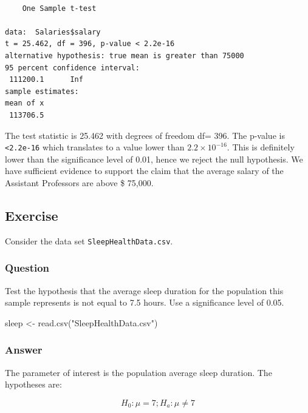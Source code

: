 \documentclass[
  letterpaper,
  DIV=11,
  numbers=noendperiod]{scrartcl}
\newenvironment{Shaded}{\begin{snugshade}}{\end{snugshade}}
\newcommand{\AttributeTok}[1]{\textcolor[rgb]{0.40,0.45,0.13}{#1}}
\newcommand{\DecValTok}[1]{\textcolor[rgb]{0.68,0.00,0.00}{#1}}
\newcommand{\FunctionTok}[1]{\textcolor[rgb]{0.28,0.35,0.67}{#1}}
\newcommand{\NormalTok}[1]{\textcolor[rgb]{0.00,0.23,0.31}{#1}}
\newcommand{\OtherTok}[1]{\textcolor[rgb]{0.00,0.23,0.31}{#1}}
\newcommand{\SpecialCharTok}[1]{\textcolor[rgb]{0.37,0.37,0.37}{#1}}
\newcommand{\StringTok}[1]{\textcolor[rgb]{0.13,0.47,0.30}{#1}}
\begin{document}
\begin{verbatim}

    One Sample t-test

data:  Salaries$salary
t = 25.462, df = 396, p-value < 2.2e-16
alternative hypothesis: true mean is greater than 75000
95 percent confidence interval:
 111200.1      Inf
sample estimates:
mean of x 
 113706.5 
\end{verbatim}

The test statistic is 25.462 with degrees of freedom df= 396. The
p-value is \texttt{\textless{}2.2e-16} which translates to a value lower
than \(2.2 \times 10^{-16}\). This is definitely lower than the
significance level of 0.01, hence we reject the null hypothesis. We have
sufficient evidence to support the claim that the average salary of the
Assistant Professors are above \$ 75,000.

\subsection{Exercise}\label{exercise-2}

Consider the data set \texttt{SleepHealthData.csv}.

\subsubsection{Question}

Test the hypothesis that the average sleep duration for the population
this sample represents is not equal to 7.5 hours. Use a significance
level of 0.05.

\begin{Shaded}
\begin{Highlighting}[]
\NormalTok{sleep }\OtherTok{\textless{}{-}} \FunctionTok{read.csv}\NormalTok{(}\StringTok{"SleepHealthData.csv"}\NormalTok{)}
\end{Highlighting}
\end{Shaded}

\subsubsection{Answer}

The parameter of interest is the population average sleep duration. The
hypotheses are:

\[
H_0: \mu=7; H_a: \mu \neq 7
\]

\begin{Shaded}
\end{Shaded}
\end{document}
